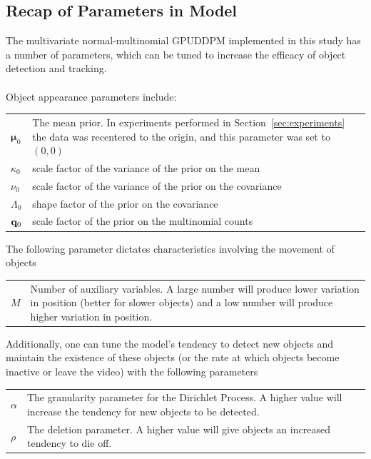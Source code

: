 \documentclass[twocolumn, final]{svjour3}
\begin{document}
\subsection{Recap of Parameters in Model}
\label{sec:recapofparameters}

The multivariate normal-multinomial GPUDDPM implemented in this study has a number of parameters, which can be tuned to increase the efficacy of object detection and tracking. \\ \\
Object appearance parameters include:
\begin{center}
\begin{tabular}[c]{l p{7cm}}
$\boldsymbol{\mu}_{0}$  &  The mean prior. In experiments performed in Section~\ref{sec:experiments} the data was recentered to the origin, and this parameter was set to $(0,0)$ \\
$\kappa_{0}$  &  scale factor of the variance of the prior on the mean\\
$\nu_{0}$  &  scale factor of the variance of the prior on the covariance\\
$\Lambda_{0}$  &  shape factor of the prior on the covariance\\
$\bold{q}_{0}$  &  scale factor of the prior on the multinomial counts
\end{tabular}
\end{center} \vspace{3mm}
The following parameter dictates characteristics involving the movement of objects
\begin{center}
\begin{tabular}[c]{l p{7cm}}
$M$  &  Number of auxiliary variables. A large number will produce lower variation in position (better for slower objects) and a low number will produce higher variation in position.
\end{tabular}
\end{center} \vspace{3mm}
Additionally, one can tune the model's tendency to detect new objects and maintain the existence of these objects (or the rate at which objects become inactive or leave the video) with the following parameters
\begin{center}
\begin{tabular}[c]{l p{7cm}}
$\alpha$  &  The granularity parameter for the Dirichlet Process. A higher value will increase the tendency for new objects to be detected.\\
$\rho$  &  The deletion parameter. A higher value will give objects an increased tendency to die off.
\end{tabular}
\end{center}
\end{document}
